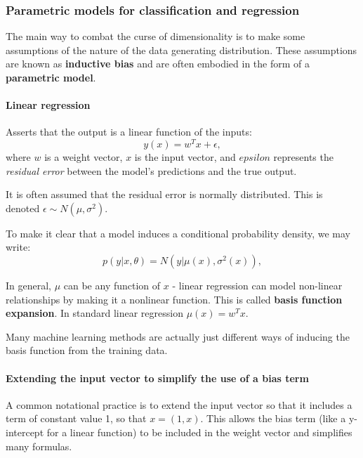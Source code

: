 \documentclass[11pt]{article}
\theoremstyle{definition}
\begin{document}
        \subsubsection{Parametric models for classification and regression}
            The main way to combat the curse of dimensionality is to make some assumptions of the nature of the data generating distribution. These assumptions are known as \textbf{inductive bias} and are often embodied in the form of a \textbf{parametric model}.
            \paragraph{Linear regression}
                Asserts that the output is a linear function of the inputs:
                \begin{equation}
                    y(x) = w^Tx+\epsilon,
                \end{equation}
                where $w$ is a weight vector, $x$ is the input vector, and $epsilon$ represents the \emph{residual error} between the model's predictions and the true output.

                It is often assumed that the residual error is normally distributed. This is denoted $\epsilon \sim N(\mu, \sigma^2).$

                To make it clear that a model induces a conditional probability density, we may write:
                \begin{equation}
                    p(y|x,\theta) = N(y|\mu(x),\sigma^2(x)),
                \end{equation}

                In general, $\mu$ can be any function of $x$ - linear regression can model non-linear relationships by making it a nonlinear function. This is called \textbf{basis function expansion}. In standard linear regression $\mu(x)=w^Tx$.
                
                Many machine learning methods are actually just different ways of inducing the basis function from the training data.

            \paragraph{Extending the input vector to simplify the use of a bias term}
                A common notational practice is to extend the input vector so that it includes a term of constant value 1, so that $x = (1,x)$. This allows the bias term (like a y-intercept for a linear function) to be included in the weight vector and simplifies many formulas.
\end{document}
